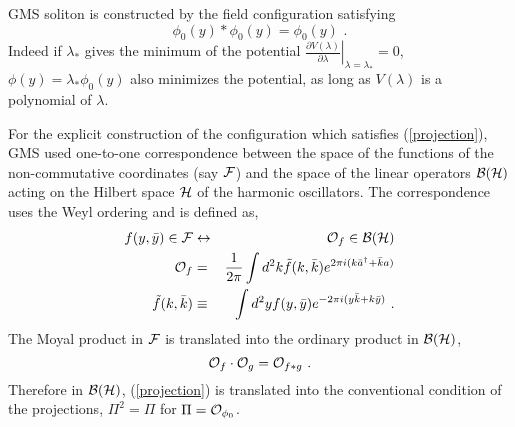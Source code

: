 \documentclass[a4paper,12pt]{article}
\begin{document}

GMS soliton is constructed by the
field configuration satisfying
\begin{equation}\label{projection}
 \phi_0(y) * \phi_0(y) = \phi_0(y)\,\,.
\end{equation}
Indeed if $\lambda_*$ gives the minimum of the potential
$\left.\frac{\partial V(\lambda)}{\partial \lambda}\right|_{\lambda
=\lambda_*}=0$, \newline
$\phi(y)=\lambda_* \phi_0(y)$ also minimizes the
potential,
as long as $V(\lambda)$ is a polynomial of $\lambda$.

For the explicit construction of the configuration
which satisfies (\ref{projection}), GMS used one-to-one
correspondence between the space of the functions of 
the non-commutative coordinates (say ${\cal F}$) and the space of
the linear operators ${\cal B}({\cal H})$ acting on the Hilbert space ${\cal H}$
of the harmonic oscillators. The correspondence uses the 
Weyl ordering and is defined as,
\begin{eqnarray}
 f(y,\bar y)\in {\cal F} & \leftrightarrow & {\cal O}_f\in {\cal B}({\cal H})\nonumber\\
 {\cal O}_f & = & \frac{1}{2\pi} \int d^2 k \tilde{f}(k,\bar k)
 e^{2\pi i (k\bar a^\dagger + \bar k a)}\\
 \tilde{f}(k,\bar k) & \equiv & \int d^2 y f(y,\bar y) e^{-2\pi i 
(y\bar k + k\bar y)}\,\,.\nonumber
\end{eqnarray}
The Moyal product in ${\cal F}$ is translated
into the ordinary product in ${\cal B}({\cal H})$,
\begin{equation}
 {\cal O}_f\cdot {\cal O}_g = {\cal O}_{f*g}\,\,.
\end{equation}
Therefore in ${\cal B}({\cal H})$, (\ref{projection}) is translated into the
conventional condition of the projections,
$\Pi^2=\Pi$  for $\Pi = {\cal O}_{\phi_0}$.
\end{document}
